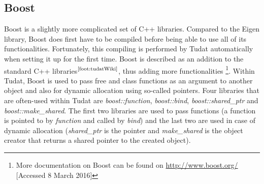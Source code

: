 \subsection{Boost}
\label{subsec:boost}
Boost is a slightly more complicated set of C++ libraries. Compared to the Eigen library, Boost does first have to be compiled before being able to use all of its functionalities. Fortunately, this compiling is performed by \ac{Tudat} automatically when setting it up for the first time. Boost is described as an addition to the standard C++ libraries$^{\text{\ref{foot:tudatWiki}}}$, thus adding more functionalities \footnote{More documentation on Boost can be found on \url{http://www.boost.org/} [Accessed 8 March 2016]}. Within \ac{Tudat}, Boost is used to pass free and class functions as an argument to another object and also for dynamic allocation using so-called pointers. Four libraries that are often-used within \ac{Tudat} are \textit{boost::function}, \textit{boost::bind}, \textit{boost::shared\_ptr} and \textit{boost::make\_shared}. The first two libraries are used to pass functions (a function is pointed to by \textit{function} and called by \textit{bind}) and the last two are used in case of dynamic allocation (\textit{shared\_ptr} is the pointer and \textit{make\_shared} is the object creator that returns a shared pointer to the created object). 

